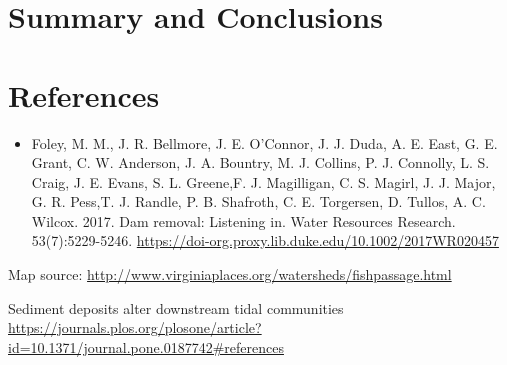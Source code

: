 \documentclass[
  12pt,
]{article}
\providecommand{\tightlist}{%
  \setlength{\itemsep}{0pt}\setlength{\parskip}{0pt}}
\begin{document}
\newpage

\hypertarget{summary-and-conclusions}{%
\section{Summary and Conclusions}\label{summary-and-conclusions}}

\newpage

\hypertarget{references}{%
\section{References}\label{references}}

\begin{itemize}
\tightlist
\item
  Foley, M. M., J. R. Bellmore, J. E. O'Connor, J. J. Duda, A. E. East,
  G. E. Grant, C. W. Anderson, J. A. Bountry, M. J. Collins, P. J.
  Connolly, L. S. Craig, J. E. Evans, S. L. Greene,F. J. Magilligan, C.
  S. Magirl, J. J. Major, G. R. Pess,T. J. Randle, P. B. Shafroth, C. E.
  Torgersen, D. Tullos, A. C. Wilcox. 2017. Dam removal: Listening in.
  Water Resources Research. 53(7):5229-5246.
  \url{https://doi-org.proxy.lib.duke.edu/10.1002/2017WR020457}
\end{itemize}

Map source:
\url{http://www.virginiaplaces.org/watersheds/fishpassage.html}

Sediment deposits alter downstream tidal communities
\url{https://journals.plos.org/plosone/article?id=10.1371/journal.pone.0187742\#references}
\end{document}
